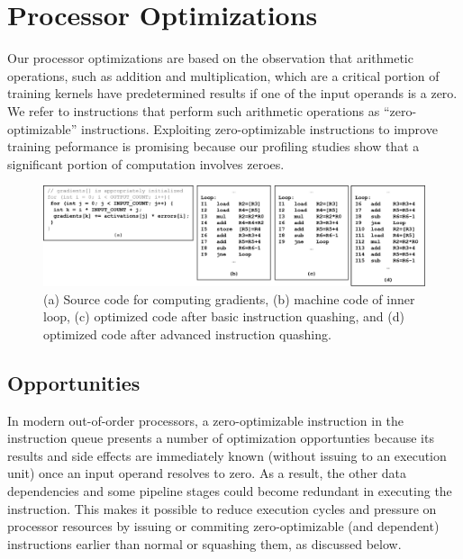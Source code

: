 \section{Processor Optimizations}
\label{sec:processor_opt}

Our processor optimizations are based on the observation that arithmetic operations, such as addition and multiplication, which are a critical portion of training kernels have predetermined results if one of the input operands is a zero. We refer to instructions that perform such arithmetic operations as ``zero-optimizable'' instructions. Exploiting zero-optimizable instructions to improve training peformance is promising because our profiling studies show that a significant portion of computation involves zeroes. 

\begin{figure}
\centering
\includegraphics[width=1.9\columnwidth]{Figures/gradient_code_opt.png}
\caption{(a) Source code for computing gradients, (b) machine code of inner loop, (c) optimized code after basic instruction quashing, and (d) optimized code after advanced instruction quashing.}
\label{fig:gradient_code_opt}
\end{figure}

\subsection{Opportunities}

In modern out-of-order processors, a zero-optimizable instruction in the instruction queue presents a number of optimization opportunties because its results and side effects are immediately known (without issuing to an execution unit) once an input operand resolves to zero.  As a result, the other data dependencies and some pipeline stages could become redundant in executing the instruction. This makes it possible to reduce execution cycles and pressure on processor resources by issuing or commiting zero-optimizable (and dependent) instructions earlier than normal or squashing them, as discussed below. 

